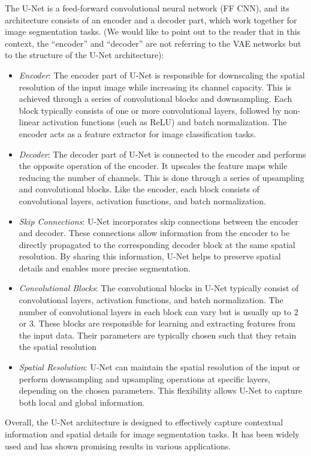 The U-Net is a feed-forward convolutional neural network (FF CNN), and its architecture consists of an encoder and a decoder part, which work together for image segmentation tasks. 
(We would like to point out to the reader that in this context, the  ``encoder'' and ``decoder'' are not referring to the VAE networks but to the structure of the U-Net architecture):
\begin{itemize}
    \item \textit{Encoder}: The encoder part of U-Net is responsible for downscaling the spatial resolution of the input
     image while increasing its channel capacity. This is achieved through a series of convolutional blocks and downsampling. 
     Each block typically consists of one or more convolutional layers, followed by non-linear activation
    functions (such as ReLU) and batch normalization. The encoder acts as a feature extractor for image
    classification tasks.
    \item \textit{Decoder}: The decoder part of U-Net is connected to the encoder and performs the opposite operation
     of the encoder. It upscales the feature maps while reducing the number of channels. This is done through 
     a series of upsampling and convolutional blocks. Like the encoder, each block consists of convolutional
    layers, activation functions, and batch normalization. 

    \item \textit{Skip Connections}: U-Net incorporates skip connections between the encoder and decoder. These 
    connections allow information from the encoder to be directly propagated to the corresponding decoder 
    block at the same spatial resolution. By sharing this information, U-Net helps to preserve spatial details
     and enables more precise segmentation.

    \item \textit{Convolutional Blocks}: The convolutional blocks in U-Net typically consist of convolutional layers, activation 
    functions, and batch normalization. The number of convolutional layers in each block can vary but is usually up to 2 or 3. 
    These blocks are responsible for learning and extracting features from the input data. Their parameters are typically chosen such
    that they retain the spatial resolution

    \item \textit{Spatial Resolution}: U-Net can maintain the spatial resolution of the input or perform downsampling and upsampling 
    operations at specific layers, depending on the chosen parameters. This flexibility allows U-Net to
     capture both local and global information.
\end{itemize}
Overall, the U-Net architecture is designed to effectively capture contextual information and spatial details for image segmentation tasks. It has been widely used and has shown promising results in various applications.